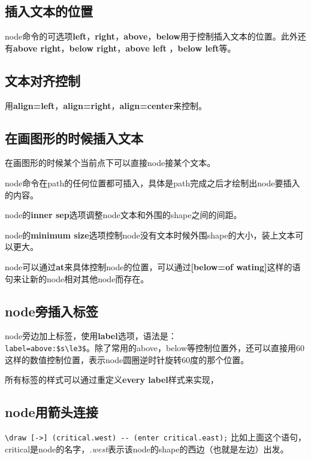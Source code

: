 \documentclass[11pt,oneside]{book}
\begin{document}
\begin{common-format}
\subsection{插入文本的位置}
node命令的可选项\textbf{left}，\textbf{right}，\textbf{above}，\textbf{below}用于控制插入文本的位置。此外还有\textbf{above right}，\textbf{below right}，\textbf{above left} ，\textbf{below left}等。

\subsection{文本对齐控制}
用\textbf{align=left}，\textbf{align=right}，\textbf{align=center}来控制。

\subsection{在画图形的时候插入文本}

在画图形的时候某个当前点下可以直接node接某个文本。

node命令在path的任何位置都可插入，具体是path完成之后才绘制出node要插入的内容。

node的\textbf{inner sep}选项调整node文本和外围的shape之间的间距。

node的\textbf{minimum size}选项控制node没有文本时候外围shape的大小，装上文本可以更大。

node可以通过\textbf{at}来具体控制node的位置，可以通过\textbf{[below=of wating]}这样的语句来让新的node相对其他node而存在。


\subsection{node旁插入标签}
node旁边加上标签，使用\textbf{label}选项，语法是：\\
\verb+label=above:$s\le3$+。除了常用的above，below等控制位置外，还可以直接用60这样的数值控制位置，表示node圆圈逆时针旋转60度的那个位置。

所有标签的样式可以通过重定义\textbf{every label}样式来实现，


\subsection{node用箭头连接}
\verb+\draw [->] (critical.west) -- (enter critical.east);+
比如上面这个语句，critical是node的名字，\emph{.west}表示该node的shape的西边（也就是左边）出发。


\end{common-format}
\end{document}
